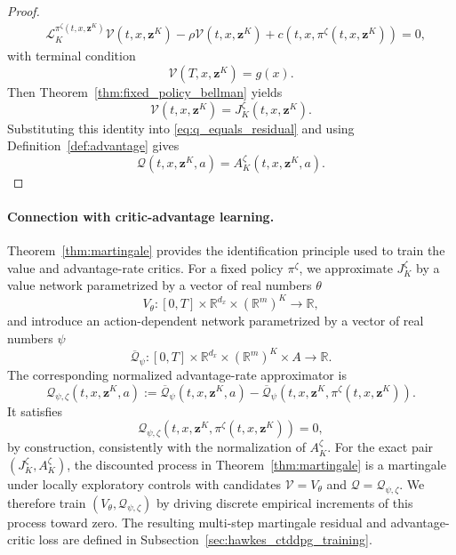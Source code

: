 \documentclass[11pt]{article}
\theoremstyle{remarkitalic}
\theoremstyle{remarkitalic}
\newcommand{\R}{\mathbb R}
\newcommand{\1}{\mathbf 1}
\begin{document}
\begin{proof}
\[
\begin{aligned}
    &
    \mathcal L_K^{
        \pi^\zeta(t,x,\mathbf z^K)
    }
    \mathcal V(t,x,\mathbf z^K)
    -
    \rho\mathcal V(t,x,\mathbf z^K)
    +
    c\left(
        t,x,\pi^\zeta(t,x,\mathbf z^K)
    \right)
    =
    0,
\end{aligned}
\]
with terminal condition
\[
    \mathcal V(T,x,\mathbf z^K)=g(x).
\]
Then Theorem~\ref{thm:fixed_policy_bellman} yields
\[
    \mathcal V(t,x,\mathbf z^K)
    =
    J_K^\zeta(t,x,\mathbf z^K).
\]
Substituting this identity into \eqref{eq:q_equals_residual} and using
Definition~\ref{def:advantage} gives
\[
    \mathcal Q(t,x,\mathbf z^K,a)
    =
    A_K^\zeta(t,x,\mathbf z^K,a).
\]
\end{proof}

\paragraph{Connection with critic-advantage learning.}

Theorem~\ref{thm:martingale} provides the identification principle
used to train the value and advantage-rate critics. For a fixed policy
$\pi^\zeta$, we approximate $J_K^\zeta$ by a value network parametrized by a vector of real numbers $\theta$
\[
    V_\theta:
    [0,T]\times\R^{d_x}\times(\R^m)^K
    \longrightarrow\R,
\]
and introduce an action-dependent network parametrized by a vector of real numbers $\psi$
\[
    \overline {\mathcal Q}_\psi:
    [0,T]\times\R^{d_x}\times(\R^m)^K\times A
    \longrightarrow\R.
\]
The corresponding normalized advantage-rate approximator is
\begin{equation}
\label{eq:normalized_advantage_critic}
    {\mathcal Q}_{\psi,\zeta}(t,x,\mathbf z^K,a)
    :=
    \overline {\mathcal Q}_\psi(t,x,\mathbf z^K,a)
    -
    \overline {\mathcal Q}_\psi
    \left(
        t,x,\mathbf z^K,
        \pi^\zeta(t,x,\mathbf z^K)
    \right).
\end{equation}
It satisfies
\[
    {\mathcal Q}_{\psi,\zeta}
    \left(
        t,x,\mathbf z^K,
        \pi^\zeta(t,x,\mathbf z^K)
    \right)
    =0,
\]
by construction, consistently with the normalization of
$A_K^\zeta$. For the exact pair
$(J_K^\zeta,A_K^\zeta)$, the discounted process in
Theorem~\ref{thm:martingale} is a martingale under locally exploratory
controls with candidates $\mathcal V=V_\theta$ and $\mathcal Q={\mathcal Q}_{\psi,\zeta}$. We therefore train $(V_\theta,{\mathcal Q}_{\psi,\zeta})$ by driving
discrete empirical increments of this process toward zero. The
resulting multi-step martingale residual and advantage-critic loss are defined
in Subsection~\ref{sec:hawkes_ctddpg_training}.
\end{document}
